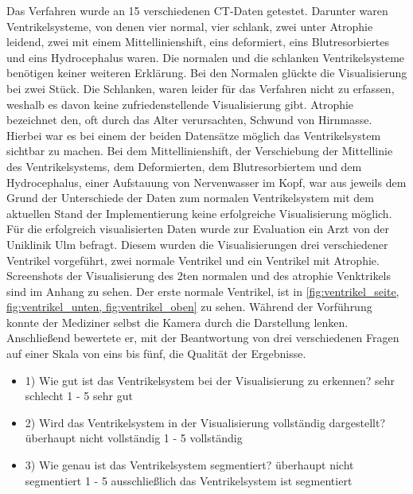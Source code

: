 Das Verfahren wurde an 15 verschiedenen CT-Daten getestet. Darunter waren Ventrikelsysteme, von denen vier normal, vier schlank, zwei unter Atrophie leidend, zwei mit einem Mittellinienshift, eins deformiert, eins Blutresorbiertes und eins Hydrocephalus waren.
\newline
Die normalen und die schlanken Ventrikelsysteme benötigen keiner weiteren Erklärung. Bei den Normalen glückte die Visualisierung bei zwei Stück. Die Schlanken, waren leider für das Verfahren nicht zu erfassen, weshalb es davon keine zufriedenstellende Visualisierung gibt. Atrophie bezeichnet den, oft durch das Alter verursachten, Schwund von Hirnmasse. Hierbei war es bei einem der beiden Datensätze möglich das Ventrikelsystem sichtbar zu machen. Bei dem Mittellinienshift, der Verschiebung der Mittellinie des Ventrikelsystems, dem Deformierten, dem Blutresorbiertem und dem Hydrocephalus, einer Aufstauung von Nervenwasser im Kopf, war aus jeweils dem Grund der Unterschiede der Daten zum normalen Ventrikelsystem mit dem aktuellen Stand der Implementierung keine erfolgreiche Visualisierung möglich.
\newline
Für die erfolgreich visualisierten Daten wurde zur Evaluation ein Arzt von der Uniklinik Ulm befragt. Diesem wurden die Visualisierungen drei verschiedener Ventrikel vorgeführt, zwei normale Ventrikel und ein Ventrikel mit Atrophie. Screenshots der Visualisierung des 2ten normalen und des atrophie Venktrikels sind im Anhang zu sehen. Der erste normale Ventrikel, ist in \autoref{fig:ventrikel_seite, fig:ventrikel_unten, fig:ventrikel_oben} zu sehen. Während der Vorführung konnte der Mediziner selbst die Kamera durch die Darstellung lenken. Anschließend bewertete er, mit der Beantwortung von drei verschiedenen Fragen auf einer Skala von eins bis fünf, die Qualität der Ergebnisse.
\begin{itemize}
	\item 1) Wie gut ist das Ventrikelsystem bei der Visualisierung zu erkennen? \newline sehr schlecht 1 - 5 sehr gut
	\item 2) Wird das Ventrikelsystem in der Visualisierung vollständig dargestellt? \newline überhaupt nicht vollständig 1 - 5 vollständig
	\item 3) Wie genau ist das Ventrikelsystem segmentiert? \newline überhaupt nicht segmentiert 1 - 5 ausschließlich das Ventrikelsystem ist segmentiert
\end{itemize}


